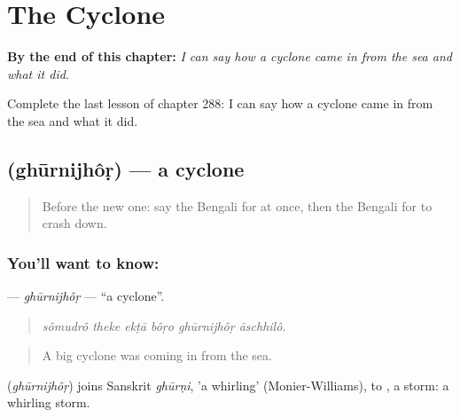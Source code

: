 
\chapter{The Cyclone}
\label{ch:bn-the-cyclone}

\begin{chapteropening}
\textbf{By the end of this chapter:} \emph{I can say how a cyclone came in from the sea and what it did.}

Complete the last lesson of chapter 288: I can say how a cyclone came in from the sea and what it did.
\end{chapteropening}

\section[\texorpdfstring{\bn{ঘূর্ণিঝড়} (ghūrnijhôṛ)}{ঘূর্ণিঝড় (ghūrnijhôṛ)}]{ (ghūrnijhôṛ) — a cyclone}

\label{lesson:BN-C288-ghurnijhor}



\begin{quote}
Before the new one: say the Bengali for at once, then the Bengali for to crash down.
\end{quote}

\subsection*{You'll want to know: }
\textbf{} — \emph{ghūrnijhôṛ} — \textquotedblleft{}a cyclone\textquotedblright{}.

\begin{quote}
     
\end{quote}

\begin{quote}
\emph{sômudrô theke ekṭā bôṛo ghūrnijhôṛ āschhilô.}
\end{quote}

\begin{quote}
A big cyclone was coming in from the sea.
\end{quote}

\begin{cousinweb}
\textbf{} (\emph{ghūrnijhôṛ}) joins Sanskrit \emph{ghūrṇi}, 'a whirling' (Monier-Williams), to \textbf{}, a storm: a whirling storm.
\end{cousinweb}

